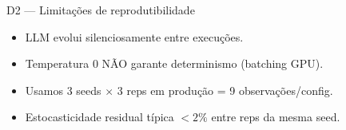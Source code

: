 \documentclass[aspectratio=169,10pt]{beamer}
\begin{document}
\begin{frame}{D2 --- Limita\c{c}\~oes de reprodutibilidade}
  \footnotesize
  \begin{itemize}
    \item LLM evolui silenciosamente entre execu\c{c}\~oes.
    \item Temperatura $0$ N\~AO garante determinismo (batching GPU).
    \item Usamos 3 seeds $\times$ 3 reps em produ\c{c}\~ao = 9 observa\c{c}\~oes/config.
    \item Estocasticidade residual t\'ipica $< 2\%$ entre reps da mesma seed.
  \end{itemize}
\end{frame}
\end{document}
